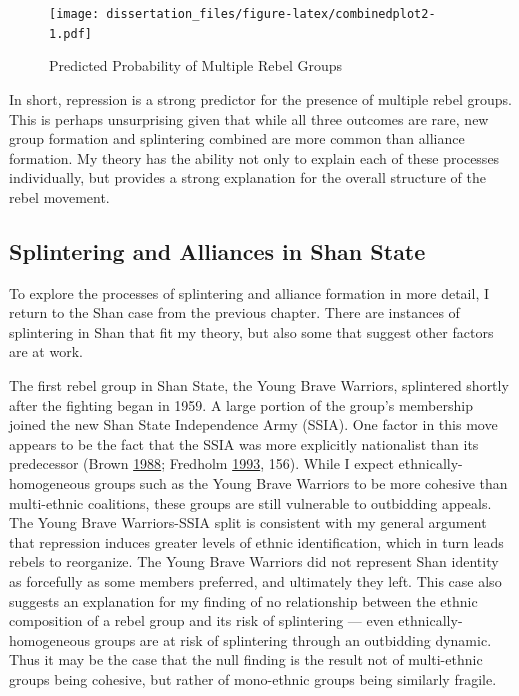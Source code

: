 \documentclass[12pt,]{book}
\theoremstyle{definition}
\theoremstyle{definition}
\theoremstyle{definition}
\theoremstyle{remark}
\begin{document}
\begin{figure}
\centering
\texttt{[image: dissertation\_files/figure-latex/combinedplot2-1.pdf]}
\caption{\label{fig:combinedplot2}Predicted Probability of Multiple Rebel
Groups}
\end{figure}

In short, repression is a strong predictor for the presence of multiple
rebel groups. This is perhaps unsurprising given that while all three
outcomes are rare, new group formation and splintering combined are more
common than alliance formation. My theory has the ability not only to
explain each of these processes individually, but provides a strong
explanation for the overall structure of the rebel movement.

\hypertarget{splintering-and-alliances-in-shan-state}{%
\subsection{Splintering and Alliances in Shan
State}\label{splintering-and-alliances-in-shan-state}}

To explore the processes of splintering and alliance formation in more
detail, I return to the Shan case from the previous chapter. There are
instances of splintering in Shan that fit my theory, but also some that
suggest other factors are at work.

The first rebel group in Shan State, the Young Brave Warriors,
splintered shortly after the fighting began in 1959. A large portion of
the group's membership joined the new Shan State Independence Army
(SSIA). One factor in this move appears to be the fact that the SSIA was
more explicitly nationalist than its predecessor (Brown
\protect\hyperlink{ref-Brown1988a}{1988}; Fredholm
\protect\hyperlink{ref-Fredholm1993}{1993}, 156). While I expect
ethnically-homogeneous groups such as the Young Brave Warriors to be
more cohesive than multi-ethnic coalitions, these groups are still
vulnerable to outbidding appeals. The Young Brave Warriors-SSIA split is
consistent with my general argument that repression induces greater
levels of ethnic identification, which in turn leads rebels to
reorganize. The Young Brave Warriors did not represent Shan identity as
forcefully as some members preferred, and ultimately they left. This
case also suggests an explanation for my finding of no relationship
between the ethnic composition of a rebel group and its risk of
splintering --- even ethnically-homogeneous groups are at risk of
splintering through an outbidding dynamic. Thus it may be the case that
the null finding is the result not of multi-ethnic groups being
cohesive, but rather of mono-ethnic groups being similarly fragile.
\end{document}
